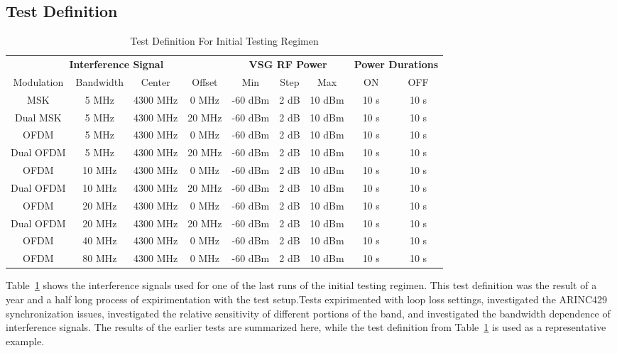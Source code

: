 \subsection{Test Definition}
\begin{table}[]
\begin{tabular}{c|c|c|c|c|c|c|c|c}
\multicolumn{4}{c|}{\textbf{Interference Signal}}   & \multicolumn{3}{c|}{\textbf{VSG RF Power}} & \multicolumn{2}{c}{\textbf{Power Durations}} \\
Modulation & Bandwidth & Center   & Offset & Min         & Step    & Max       & ON                & OFF              \\ \hline
MSK        & 5 MHz     & 4300 MHz & 0 MHz  & -60 dBm     & 2 dB    & 10 dBm    & 10 s              & 10 s             \\
Dual MSK   & 5 MHz     & 4300 MHz & 20 MHz & -60 dBm     & 2 dB    & 10 dBm    & 10 s              & 10 s             \\ \hline
OFDM       & 5 MHz     & 4300 MHz & 0 MHz  & -60 dBm     & 2 dB    & 10 dBm    & 10 s              & 10 s             \\
Dual OFDM  & 5 MHz     & 4300 MHz & 20 MHz & -60 dBm     & 2 dB    & 10 dBm    & 10 s              & 10 s             \\ \hline
OFDM       & 10 MHz    & 4300 MHz & 0 MHz  & -60 dBm     & 2 dB    & 10 dBm    & 10 s              & 10 s             \\
Dual OFDM  & 10 MHz    & 4300 MHz & 20 MHz & -60 dBm     & 2 dB    & 10 dBm    & 10 s              & 10 s             \\ \hline
OFDM       & 20 MHz    & 4300 MHz & 0 MHz  & -60 dBm     & 2 dB    & 10 dBm    & 10 s              & 10 s             \\
Dual OFDM  & 20 MHz    & 4300 MHz & 20 MHz & -60 dBm     & 2 dB    & 10 dBm    & 10 s              & 10 s             \\ \hline
OFDM       & 40 MHz    & 4300 MHz & 0 MHz  & -60 dBm     & 2 dB    & 10 dBm    & 10 s              & 10 s             \\
OFDM       & 80 MHz    & 4300 MHz & 0 MHz  & -60 dBm     & 2 dB    & 10 dBm    & 10 s              & 10 s            
\end{tabular}
\caption{Test Definition For Initial Testing Regimen}
\label{tab:initial_signals}


\end{table}
Table~\ref{tab:initial_signals} shows the interference signals used for one of the last runs of the initial testing regimen. This test definition was the result of a year and a half long process of expirimentation with the test setup.Tests expirimented with loop loss settings, investigated the ARINC429 synchronization issues, investigated the relative sensitivity of different portions of the band, and investigated the bandwidth dependence of interference signals. The results of the earlier tests are summarized here, while the test definition from Table~\ref{tab:initial_signals} is used as a representative example. 

